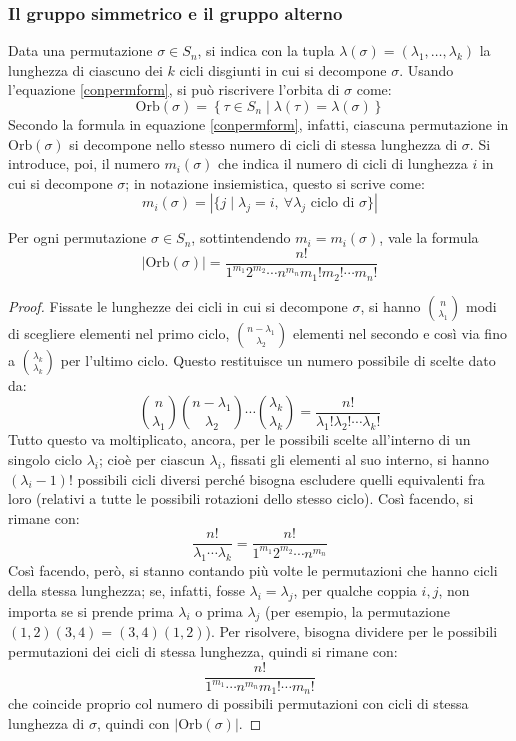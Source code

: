 \documentclass[11pt, a4paper]{scrartcl}
\theoremstyle{definition}
\numberwithin{esempio}{section}
\theoremstyle{definition}
\numberwithin{obs}{section}
\numberwithin{nota}{section}
\numberwithin{equation}{subsection}
\begin{document}
\subsubsection{Il gruppo simmetrico e il gruppo alterno}
Data una permutazione $\sigma \in S_n$, si indica con la tupla $\lambda (\sigma ) = (\lambda_1, \ldots, \lambda _k)$ la lunghezza di ciascuno dei $k$ cicli disgiunti in cui si decompone $\sigma $.
Usando l'equazione \ref{conpermform}, si pu\`o riscrivere l'orbita di $\sigma $ come:
\[
\mathrm{Orb} (\sigma ) = \left\{ \tau  \in S_n  \mid \lambda (\tau ) = \lambda (\sigma ) \right\} 
\] 
Secondo la formula in equazione \ref{conpermform}, infatti, ciascuna permutazione in $\mathrm{Orb} (\sigma )$ si decompone nello stesso numero di cicli di stessa lunghezza di $\sigma $.
Si introduce, poi, il numero $m_i(\sigma )$ che indica il numero di cicli di lunghezza $i$ in cui si decompone $\sigma $; in notazione insiemistica, questo si scrive come:
\[
m_i(\sigma ) =  \left\lvert \big\{ j  \mid \lambda _j = i, \ \forall \lambda _j \text{ ciclo di } \sigma \big\} \right\rvert 
\] 
\begin{prop}
	{}{}	
	Per ogni permutazione $\sigma \in S_n$, sottintendendo $m_i = m_i(\sigma )$, vale la formula
	\[
	\left\lvert \mathrm{Orb} (\sigma ) \right\rvert = \frac{n!}{1^{m_1} 2^{m_2} \cdots n^{m_n} m_1!m_2!\cdots m_n!}
	\] 
	\begin{proof}
		Fissate le lunghezze dei cicli in cui si decompone $\sigma $, si hanno $\binom{n}{\lambda _1}$ modi di scegliere elementi nel primo ciclo, $\binom{n-\lambda _1}{\lambda _2}$ elementi nel secondo e cos\`i via fino a $\binom{\lambda _k}{\lambda _k}$ per l'ultimo ciclo.
		Questo restituisce un numero possibile di scelte dato da:
		\[
			\binom{n}{\lambda _1} \binom{n-\lambda _1}{\lambda _2} \cdots \binom{\lambda _k}{\lambda _k} = \frac{n!}{\lambda _1! \lambda _2! \cdots \lambda _k!}
		\] 
	Tutto questo va moltiplicato, ancora, per le possibili scelte all'interno di un singolo ciclo $\lambda _i$; cio\`e per ciascun $\lambda _i$, fissati gli elementi al suo interno, si hanno $(\lambda _i -1)!$ possibili cicli diversi perch\'e bisogna escludere quelli equivalenti fra loro (relativi a tutte le possibili rotazioni dello stesso ciclo). Cos\`i facendo, si rimane con:
	\[
	\frac{n!}{\lambda_1 \cdots\lambda _k} = \frac{n!}{1^{m_1} 2^{m_2} \cdots n^{m_n} }
	\] 
	Cos\`i facendo, per\`o, si stanno contando pi\`u volte le permutazioni che hanno cicli della stessa lunghezza; se, infatti, fosse $\lambda _i = \lambda _j$, per qualche coppia $i,j$, non importa se si prende prima $\lambda _i$ o prima $\lambda _j$ (per esempio, la permutazione $(1,2)(3,4) = (3,4)(1,2)$).
	Per risolvere, bisogna dividere per le possibili permutazioni dei cicli di stessa lunghezza, quindi si rimane con:
	\[
	\frac{n!}{1^{m_1}\cdots n^{m_n} m_1! \cdots m_n!}
	\] 
	che coincide proprio col numero di possibili permutazioni con cicli di stessa lunghezza di $\sigma $, quindi con $\left\lvert \mathrm{Orb} (\sigma ) \right\rvert $.
	\end{proof}
\end{prop}
\end{document}
